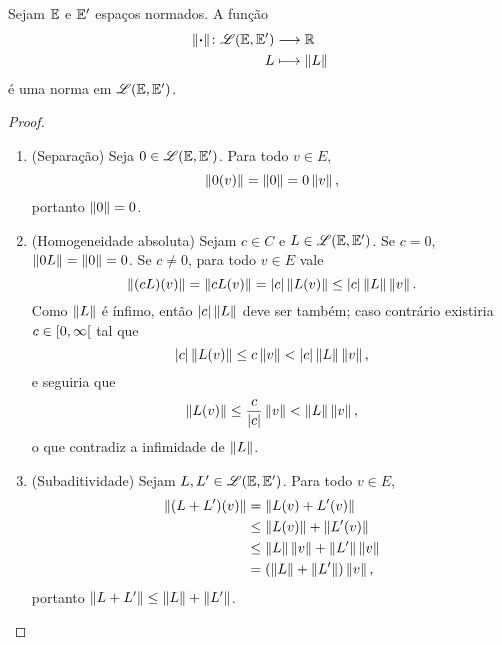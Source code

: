 \begin{proposition}
Sejam $\E$ e $\E'$ espaços normados. A função
	\begin{align*}
	\func{\nor{\var}}{\toplin(\E,\E')}{\R}{L}{\nor{L}}
	\end{align*}
é uma norma em $\toplin(\E,\E')$.
\end{proposition}
\begin{proof}
	\begin{enumerate}
	\item (Separação) Seja $0 \in \toplin(\E,\E')$. Para todo $v \in E$,
	\begin{equation*}
	\nor{0(v)} = \nor{0}=0\nor{v},
	\end{equation*}
portanto $\nor{0}=0$.
	
	\item (Homogeneidade absoluta) Sejam $c \in C$ e $L \in \toplin(\E,\E')$. Se $c=0$, $\nor{0L}=\nor{0}=0$. Se $c \neq 0$, para todo $v \in E$ vale
	\begin{equation*}
	\nor{(cL)(v)} = \nor{cL(v)} = \abs{c}\nor{L(v)} \leq \abs{c}\nor{L}\nor{v}.
	\end{equation*}
Como $\nor{L}$ é ínfimo, então $\abs{c}\nor{L}$ deve ser também; caso contrário existiria $c \in \intfa{0}{\infty}$ tal que
	\begin{equation*}
	\abs{c}\nor{L(v)} \leq c\nor{v} < \abs{c}\nor{L}\nor{v},
	\end{equation*}
e seguiria que
	\begin{equation*}
	\nor{L(v)} \leq \frac{c}{\abs{c}}\nor{v} < \nor{L}\nor{v},
	\end{equation*}
o que contradiz a infimidade de $\nor{L}$.
	
	\item (Subaditividade) Sejam $L,L' \in \toplin(\E,\E')$. Para todo $v \in E$,
	\begin{align*}
	\nor{(L+L')(v)} &= \nor{L(v)+L'(v)} \\
		&\leq \nor{L(v)} + \nor{L'(v)} \\
		&\leq \nor{L}\nor{v} + \nor{L'}\nor{v} \\
		&= (\nor{L}+\nor{L'})\nor{v},
	\end{align*}
portanto $\nor{L+L'} \leq \nor{L}+\nor{L'}$. \qedhere
	\end{enumerate}
\end{proof}












